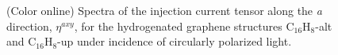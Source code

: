 \documentclass[pss]{wiley2sp} %
\begin{document}
\begin{figure}[t]
\hfill
{}
\caption{(Color online) Spectra of the injection current tensor along the
     \emph{a} direction, {$\eta^{axy}$}, for the hydrogenated graphene structures
    C$_{16}$H$_{8}$-alt and C$_{16}$H$_{8}$-up under incidence of circularly polarized light.\label{fig:eta}}
\end{figure}
\end{document}
